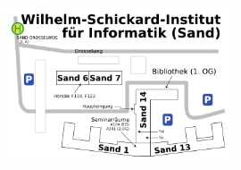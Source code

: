 \begin{figure}[ht!]
\begin{minipage}[t]{.5\linewidth}
	\end{minipage}
\end{figure}

\begin{figure}[ht!]
	\centering
	\includegraphics[width=0.6\textwidth]{shared/anhang/lageplaene/uebersicht_sand.pdf}
\end{figure}
